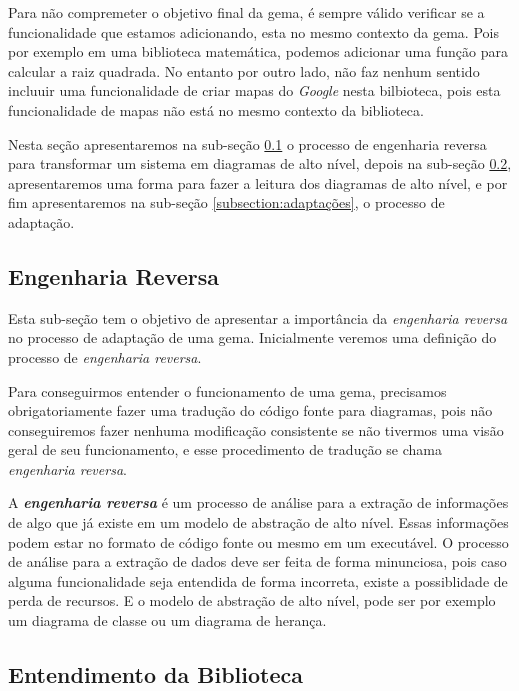 Para não compremeter o objetivo final da gema, é sempre válido verificar se a funcionalidade
que estamos adicionando, esta no mesmo contexto da gema. Pois por exemplo em uma biblioteca matemática,
podemos adicionar uma função para calcular a raiz quadrada. No entanto por outro lado,
não faz nenhum sentido incluuir uma funcionalidade de criar mapas do \emph{Google} nesta bilbioteca,
pois esta funcionalidade de mapas não está no mesmo contexto da biblioteca.

Nesta seção apresentaremos na sub-seção \ref{subsection:engenharia_reversa} o processo de engenharia
reversa para transformar um sistema em diagramas de alto nível, depois na sub-seção
\ref{subsection:entendimento_da_biblioteca}, apresentaremos uma forma para fazer a leitura dos
diagramas de alto nível, e por fim apresentaremos na sub-seção \ref{subsection:adaptações}, o processo
de adaptação.


\subsection{Engenharia Reversa}
\label{subsection:engenharia_reversa}


Esta sub-seção tem o objetivo de apresentar a importância da \emph{engenharia reversa} no processo de adaptação
de uma gema. Inicialmente veremos uma definição do processo de \emph{engenharia reversa}.

Para conseguirmos entender o funcionamento de uma gema, precisamos obrigatoriamente fazer uma tradução
do código fonte para diagramas, pois não conseguiremos fazer nenhuma modificação consistente
se não tivermos uma visão geral de seu funcionamento, e esse procedimento de tradução se chama 
\emph{engenharia reversa}.

A \textbf{\emph{engenharia reversa}} é um processo de análise para a extração de informações de algo que já 
existe em um modelo de abstração de alto nível. Essas informações podem estar no formato de código 
fonte ou mesmo em um executável. O processo de análise para a extração de dados deve ser feita de forma
minunciosa, pois caso alguma funcionalidade seja entendida de forma incorreta, existe a possiblidade de
perda de recursos. E o modelo de abstração de alto nível, pode ser por exemplo um diagrama de classe
ou um diagrama de herança.
 
 
\subsection{Entendimento da Biblioteca} 
\label{subsection:entendimento_da_biblioteca}


